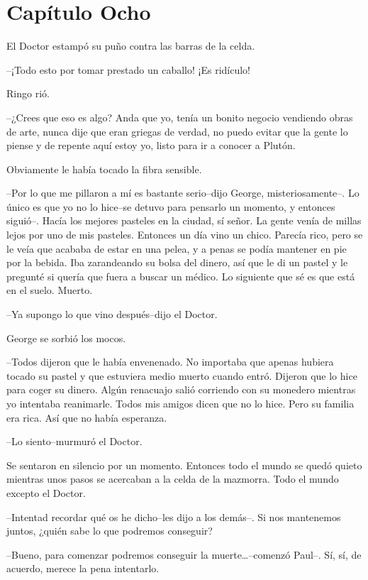 \chapter*{Capítulo Ocho}

El Doctor estampó su puño contra las barras de la celda.

--¡Todo esto por tomar prestado un caballo! ¡Es ridículo!

Ringo rió.

--¿Crees que eso es algo? Anda que yo, tenía un bonito negocio vendiendo
obras de arte, nunca dije que eran griegas de verdad, no puedo evitar
que la gente lo piense y de repente aquí estoy yo, listo para ir a
conocer a Plutón.

Obviamente le había tocado la fibra sensible.

--Por lo que me pillaron a mí es bastante serio--dijo George,
misteriosamente--. Lo único es que yo no lo hice--se detuvo para
pensarlo un momento, y entonces siguió--. Hacía los mejores pasteles en
la ciudad, sí señor. La gente venía de millas lejos por uno de mis
pasteles. Entonces un día vino un chico. Parecía rico, pero se le veía
que acababa de estar en una pelea, y a penas se podía mantener en pie
por la bebida. Iba zarandeando su bolsa del dinero, así que le di un
pastel y le pregunté si quería que fuera a buscar un médico. Lo
siguiente que sé es que está en el suelo. Muerto.

--Ya supongo lo que vino después--dijo el Doctor.

George se sorbió los mocos.

--Todos dijeron que le había envenenado. No importaba que apenas hubiera
tocado su pastel y que estuviera medio muerto cuando entró. Dijeron que
lo hice para coger su dinero. Algún renacuajo salió corriendo con su
monedero mientras yo intentaba reanimarle. Todos mis amigos dicen que no
lo hice. Pero su familia era rica. Así que no había esperanza.

--Lo siento--murmuró el Doctor.

Se sentaron en silencio por un momento. Entonces todo el mundo se quedó
quieto mientras unos pasos se acercaban a la celda de la mazmorra. Todo
el mundo excepto el Doctor.

--Intentad recordar qué os he dicho--les dijo a los demás--. Si nos
mantenemos juntos, ¿quién sabe lo que podremos conseguir?

--Bueno, para comenzar podremos conseguir la muerte\ldots{}--comenzó
Paul--. Sí, sí, de acuerdo, merece la pena intentarlo.

